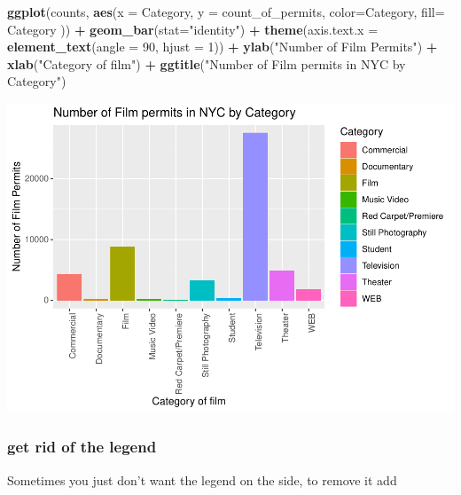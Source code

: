 \documentclass[
]{book}
\newenvironment{Shaded}{\begin{snugshade}}{\end{snugshade}}
\newcommand{\AttributeTok}[1]{\textcolor[rgb]{0.13,0.29,0.53}{#1}}
\newcommand{\DecValTok}[1]{\textcolor[rgb]{0.00,0.00,0.81}{#1}}
\newcommand{\FunctionTok}[1]{\textcolor[rgb]{0.13,0.29,0.53}{\textbf{#1}}}
\newcommand{\NormalTok}[1]{#1}
\newcommand{\SpecialCharTok}[1]{\textcolor[rgb]{0.81,0.36,0.00}{\textbf{#1}}}
\newcommand{\StringTok}[1]{\textcolor[rgb]{0.31,0.60,0.02}{#1}}
\begin{document}
\begin{Shaded}
\begin{Highlighting}[]
\FunctionTok{ggplot}\NormalTok{(counts, }\FunctionTok{aes}\NormalTok{(}\AttributeTok{x =}\NormalTok{ Category, }\AttributeTok{y =}\NormalTok{ count\_of\_permits, }
                   \AttributeTok{color=}\NormalTok{Category, }
                   \AttributeTok{fill=}\NormalTok{ Category )) }\SpecialCharTok{+}
  \FunctionTok{geom\_bar}\NormalTok{(}\AttributeTok{stat=}\StringTok{"identity"}\NormalTok{) }\SpecialCharTok{+} 
  \FunctionTok{theme}\NormalTok{(}\AttributeTok{axis.text.x =} \FunctionTok{element\_text}\NormalTok{(}\AttributeTok{angle =} \DecValTok{90}\NormalTok{, }\AttributeTok{hjust =} \DecValTok{1}\NormalTok{)) }\SpecialCharTok{+}
  \FunctionTok{ylab}\NormalTok{(}\StringTok{"Number of Film Permits"}\NormalTok{) }\SpecialCharTok{+} 
  \FunctionTok{xlab}\NormalTok{(}\StringTok{"Category of film"}\NormalTok{) }\SpecialCharTok{+}
  \FunctionTok{ggtitle}\NormalTok{(}\StringTok{"Number of Film permits in NYC by Category"}\NormalTok{)}
\end{Highlighting}
\end{Shaded}

\includegraphics{Statistics_Lab_files/figure-latex/1categoryG-1.pdf}

\hypertarget{get-rid-of-the-legend}{%
\subsubsection{get rid of the legend}\label{get-rid-of-the-legend}}

Sometimes you just don't want the legend on the side, to remove it add
\end{document}
